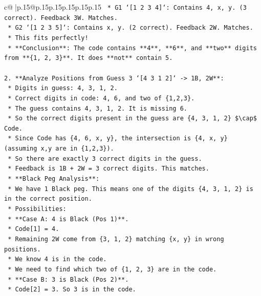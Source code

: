 \documentclass{article}
\begin{document}
{\begin{supertabular}{c@{$\;$}|p{.15\linewidth}@{}p{.15\linewidth}p{.15\linewidth}p{.15\linewidth}p{.15\linewidth}p{.15\linewidth}}
{{{\texttt{                    *   G1 `{[}1 2 3 4{]}`: Contains 4, x, y. (3 correct). Feedback 3W. Matches.} \\
\texttt{                    *   G2 `{[}1 2 3 5{]}`: Contains x, y. (2 correct). Feedback 2W. Matches.} \\
\texttt{                    *   This fits perfectly!} \\
\texttt{                    *   **Conclusion**: The code contains **4**, **6**, and **two** digits from **\{1, 2, 3\}**. It does **not** contain 5.} \\
\\ 
\texttt{2.  **Analyze Positions from Guess 3 `{[}4 3 1 2{]}` {-}> 1B, 2W**:} \\
\texttt{    *   Digits in guess: 4, 3, 1, 2.} \\
\texttt{    *   Correct digits in code: 4, 6, and two of \{1,2,3\}.} \\
\texttt{    *   The guess contains 4, 3, 1, 2. It is missing 6.} \\
\texttt{    *   So the correct digits present in the guess are \{4, 3, 1, 2\} \$\textbackslash{}cap\$ Code.} \\
\texttt{    *   Since Code has \{4, 6, x, y\}, the intersection is \{4, x, y\} (assuming x,y are in \{1,2,3\}).} \\
\texttt{    *   So there are exactly 3 correct digits in the guess.} \\
\texttt{    *   Feedback is 1B + 2W = 3 correct digits. This matches.} \\
\texttt{    *   **Black Peg Analysis**:} \\
\texttt{        *   We have 1 Black peg. This means one of the digits \{4, 3, 1, 2\} is in the correct position.} \\
\texttt{        *   Possibilities:} \\
\texttt{            *   **Case A: 4 is Black (Pos 1)**.} \\
\texttt{                *   Code{[}1{]} = 4.} \\
\texttt{                *   Remaining 2W come from \{3, 1, 2\} matching \{x, y\} in wrong positions.} \\
\texttt{                *   We know 4 is in the code.} \\
\texttt{                *   We need to find which two of \{1, 2, 3\} are in the code.} \\
\texttt{            *   **Case B: 3 is Black (Pos 2)**.} \\
\texttt{                *   Code{[}2{]} = 3. So 3 is in the code.} \\
}}}
\end{supertabular}}
\end{document}
